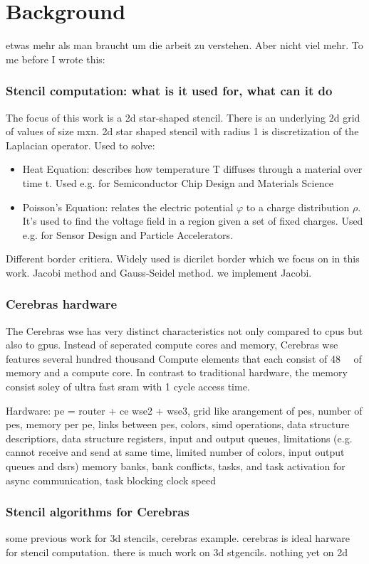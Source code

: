 \chapter{Background}
etwas mehr als man braucht um die arbeit zu verstehen. Aber nicht viel mehr.
To me before I wrote this:
\subsection{Stencil computation: what is it used for, what can it do}
The focus of this work is a 2d star-shaped stencil. There is an underlying 2d grid of values of size mxn.  
2d star shaped stencil with radius 1 is discretization of the Laplacian operator.
Used to solve:
\begin{itemize}
    \item Heat Equation: describes how temperature T diffuses through a material over time t. Used e.g. for Semiconductor Chip Design and Materials Science
    \item Poisson's Equation: relates the electric potential $\varphi$ to a charge distribution $\rho$. It's used to find the voltage field in a region given a set of fixed charges. Used e.g. for Sensor Design and Particle Accelerators.
\end{itemize}
Different border critiera. Widely used is dicrilet border which we focus on in this work.
Jacobi method and Gauss-Seidel method. we implement Jacobi.
\subsection{Cerebras hardware}
The Cerebras \ac{wse} has very distinct characteristics not only compared to \acp{cpu} but also to \acp{gpu}.
Instead of seperated compute cores and memory, Cerebras \ac{wse} features several hundred thousand Compute elements that each consist of \qty{48}{\kilo\byte} of memory and a compute core. In contrast to traditional hardware, the memory consist soley of ultra fast \ac{sram} with 1 cycle access time.







Hardware: \ac{pe} = router + \ac{ce}
wse2 + wse3, grid like arangement of \acp{pe}, number of \acp{pe}, memory per \ac{pe}, links between \acp{pe}, colors, simd operations, data structure descriptiors, data structure registers, input and output queues, limitations (e.g. cannot receive and send at same time, limited number of colors, input output queues and dsrs)
memory banks, bank conflicts, 
tasks, and task activation for async communication, task blocking
clock speed
\subsection{Stencil algorithms for Cerebras}
some previous work for 3d stencils, cerebras example.
cerebras is ideal harware for stencil computation. 
there is much work on 3d stgencils. nothing yet on 2d 